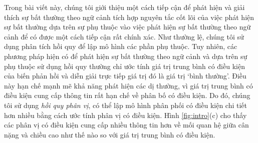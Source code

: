 Trong bài viết này, chúng tôi giới thiệu một cách tiếp cận để phát hiện và giải thích sự bất thường theo ngữ cảnh tích hợp nguyên tắc cốt lõi của việc phát hiện sự bất thường dựa trên sự phụ thuộc vào việc phát hiện sự bất thường theo ngữ cảnh để có được một cách tiếp cận rất chính xác. Như thường lệ, chúng tôi sử dụng phân tích hồi quy để lập mô hình các phần phụ thuộc. Tuy nhiên, các phương pháp hiện có để phát hiện sự bất thường theo ngữ cảnh và dựa trên sự phụ thuộc sử dụng hồi quy thường chỉ ước tính giá trị trung bình có điều kiện của biến phản hồi và diễn giải trực tiếp giá trị đó là giá trị `bình thường'. Điều này hạn chế mạnh mẽ khả năng phát hiện các dị thường, vì giá trị trung bình có điều kiện cung cấp thông tin rất hạn chế về phân bố có điều kiện. Do đó, chúng tôi sử dụng \emph{hồi quy phân vị}, có thể lập mô hình phân phối có điều kiện chi tiết hơn nhiều bằng cách ước tính phân vị có điều kiện. Hình \ref{fig:intro}(c) cho thấy các phân vị có điều kiện cung cấp nhiều thông tin hơn về mối quan hệ giữa cân nặng và chiều cao như thế nào so với giá trị trung bình có điều kiện.

